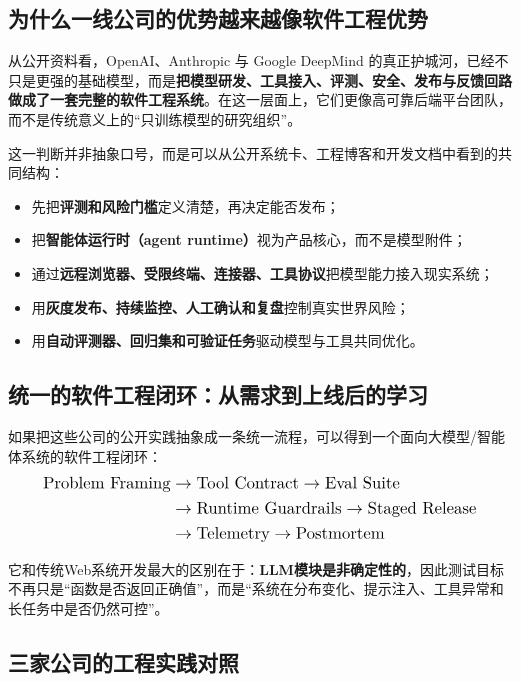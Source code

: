 \documentclass[12pt,a4paper]{article}
\begin{document}
\subsection{为什么一线公司的优势越来越像软件工程优势}

从公开资料看，OpenAI、Anthropic 与 Google DeepMind 的真正护城河，已经不只是更强的基础模型，而是\textbf{把模型研发、工具接入、评测、安全、发布与反馈回路做成了一套完整的软件工程系统}。在这一层面上，它们更像高可靠后端平台团队，而不是传统意义上的“只训练模型的研究组织”。

这一判断并非抽象口号，而是可以从公开系统卡、工程博客和开发文档中看到的共同结构：
\begin{itemize}
    \item 先把\textbf{评测和风险门槛}定义清楚，再决定能否发布；
    \item 把\textbf{智能体运行时（agent runtime）}视为产品核心，而不是模型附件；
    \item 通过\textbf{远程浏览器、受限终端、连接器、工具协议}把模型能力接入现实系统；
    \item 用\textbf{灰度发布、持续监控、人工确认和复盘}控制真实世界风险；
    \item 用\textbf{自动评测器、回归集和可验证任务}驱动模型与工具共同优化。
\end{itemize}

\subsection{统一的软件工程闭环：从需求到上线后的学习}

如果把这些公司的公开实践抽象成一条统一流程，可以得到一个面向大模型/智能体系统的软件工程闭环：
\[
\resizebox{0.9\linewidth}{!}{$
\begin{aligned}
\text{Problem Framing}
&\rightarrow \text{Tool Contract}
\rightarrow \text{Eval Suite} \\
&\rightarrow \text{Runtime Guardrails}
\rightarrow \text{Staged Release} \\
&\rightarrow \text{Telemetry}
\rightarrow \text{Postmortem}
\end{aligned}
$}
\]

它和传统Web系统开发最大的区别在于：\textbf{LLM模块是非确定性的}，因此测试目标不再只是“函数是否返回正确值”，而是“系统在分布变化、提示注入、工具异常和长任务中是否仍然可控”。
\subsection{三家公司的工程实践对照}
\end{document}
